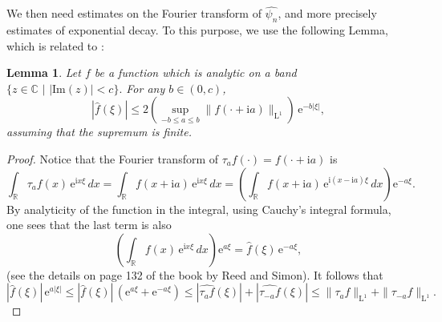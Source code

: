 \documentclass[12pt,a4paper,reqno]{amsart}
\newcommand{\R}{\mathbb{R}}
\newcommand{\CC}{\mathbb{C}}
\newcommand{\E}{\mathrm{e}}
\newcommand{\I}{\mathrm{i}}
\newcommand{\leb}{\mathrm{L}}
\newtheorem{lemma}[theorem]{Lemma}
\theoremstyle{remark}
\begin{document}
We then need estimates on the Fourier transform of $\widehat{\psi_n}$, and more precisely estimates of exponential decay. To this purpose, we use the following Lemma, which is related to \cite[Theorem IX.13, p. 18]{RS75}:

\begin{lemma}
Let $f$ be a function which is analytic on a band $\{z \in \CC\,\,|\,\,|\mathrm{Im}(z)|<c\}.$ 
For any $b \in (0,c)$,
$$|\widehat{f}(\xi) |\leq 2\left(\sup_{-b\leq a \leq b} \|f(\cdot + \I a)\|_{\leb^1}\right)\,\E^{-b|\xi|},$$
assuming that the supremum is finite.
\end{lemma}

\begin{proof}
Notice that the Fourier transform of $\tau_af(\cdot) =f(\cdot + \I a)$ is
$$\int_{\R} \tau_a f(x)\,\E^{\I x \xi}\,dx = \int_{\R} f(x+\I a)\,\E^{\I x \xi}\,dx = \left(\int_{\R} f(x+\I a)\,\E^{\I (x-\I a) \xi}\,dx\right)\E^{-a\xi}.$$
By analyticity of the function in the integral, using Cauchy's integral formula, one sees that the last term is also
$$\left(\int_{\R} f(x)\,\E^{\I x \xi}\,dx\right)\E^{a\xi} = \widehat{f}(\xi)\,\E^{-a\xi},$$
(see the details on page 132 of the book by Reed and Simon). It follows that
$$|\widehat{f}(\xi)|\,\E^{a|\xi|} \leq |\widehat{f}(\xi)|\,(\E^{a\xi}+\E^{-a\xi}) \leq |\widehat{\tau_af}(\xi)|+|\widehat{\tau_{-a}f}(\xi)| \leq \|\tau_af\|_{\leb^1}+\|\tau_{-a}f\|_{\leb^1}.$$
\end{proof}
\bigskip
\end{document}
